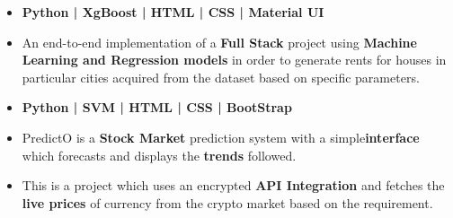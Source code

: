 






\begin{itemize}
\item \textbf{Python | XgBoost | HTML | CSS | Material UI}
\item An end-to-end implementation of a \textbf{Full Stack} project using \textbf{Machine Learning and Regression models} in order to generate rents for houses in particular cities acquired from the dataset based on specific parameters.\
\end{itemize}
\smallskip
{}
\begin{itemize}
\item \textbf{Python | SVM | HTML | CSS | BootStrap}
\item PredictO is a \textbf{Stock Market} prediction system with a simple\textbf{interface} which forecasts and displays the \textbf{trends} followed.
\end{itemize}
\smallskip
\smallskip
{}
\begin{itemize}
\item This is a project which uses an encrypted \textbf{API Integration} and fetches the \textbf{live prices} of currency from the crypto market based on the requirement. \
\end{itemize}
\smallskip

